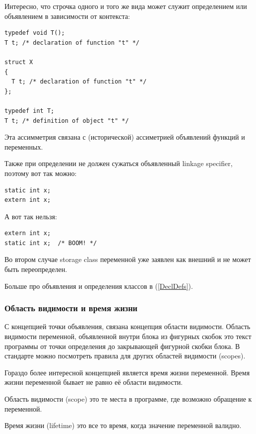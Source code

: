 \documentclass[a4paper,12pt,oneside]{article}
\newif\ifanswers
\begin{document}
\ifanswers
Ответ: могут быть всегда разные, так как UB
\fi

Интересно, что строчка одного и того же вида может служит определением или объявлением в зависимости от контекста:

\begin{lstlisting}
typedef void T();
T t; /* declaration of function "t" */

struct X 
{ 
  T t; /* declaration of function "t" */
};

typedef int T;
T t; /* definition of object "t" */
\end{lstlisting}

Эта ассимметрия связана с (исторической) ассиметрией объявлений функций и переменных.

Также при определении не должен сужаться объявленный linkage specifier, поэтому вот так можно:

\begin{lstlisting}
static int x;
extern int x;
\end{lstlisting}

А вот так нельзя:

\begin{lstlisting}
extern int x;
static int x;  /* BOOM! */
\end{lstlisting}

Во втором случае storage class переменной уже заявлен как внешний и не может быть переопределен.

Больше про объявления и определения классов в (\ref{DeclDefs}).

\subsubsection{Область видимости и время жизни}\label{ScopeLifeTime}

С концепцией точки объявления, связана концепция области видимости. Область видимости  переменной, объявленной внутри блока из фигурных скобок это текст программы от точки определения до закрывающей фигурной скобки блока. В стандарте можно посмотреть правила для других областей видимости (scopes).

Гораздо более интересной концепцией является время жизни переменной. Время жизни переменной бывает не равно её области видимости.

Область видимости (scope) это те места в программе, где возможно обращение к переменной.

Время жизни (lifetime) это все то время, когда значение переменной валидно.
\end{document}
